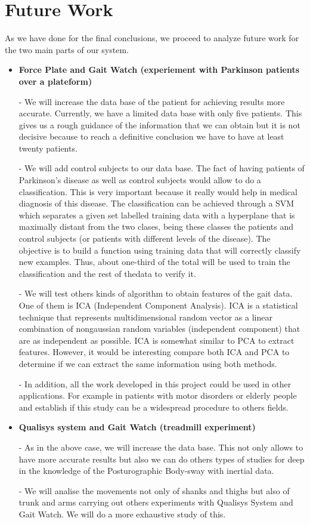\section{Future Work}
As we have done for the final conclusions, we proceed to analyze future work for the two main parts of our system.

\begin{itemize}
\item \textbf{Force Plate and Gait Watch (experiement with Parkinson patients over a plateform)}

- We will increase the data base of the patient for achieving results more accurate. Currently, we have a limited data base with only five patients. This gives us a rough guidance of the information that we can obtain but it is not decisive because to reach a definitive conclusion we have to have at least twenty patients.

-	We will add control subjects to our data base. The fact of having patients of Parkinson’s disease as well as control subjects would allow to do a classification. This is very important because it really would help in medical diagnosis of this disease.
The classification can be achieved through a SVM which separates a given set labelled training data with a hyperplane that is maximally distant from the two clases, being these classes the patients and control subjects (or patients with different levels of the disease). The objective is to build a function using training data that will correctly classify new examples. Thus, about one-third of the total will be used to train the classification and the rest of thedata to verify it.

- We will test others kinds of algorithm to obtain features of the gait data. One of them is ICA (Independent Component Analysis).  ICA is a statistical technique that represents multidimensional random vector  as a linear combination of nongaussian random variables (independent component) that are as independent as possible. ICA is somewhat similar to PCA to extract features. However, it would be interesting compare both ICA and PCA to determine if we can extract the same information using both methods. 

- In addition, all the work developed in this project could be used in other applications. For example in patients with motor disorders or elderly people and establish if this study can be a widespread procedure to others fields.

\item \textbf{Qualisys system and Gait Watch (treadmill experiment)}

-	As in the above case, we will increase the data base. This not only allows to have more accurate results but also we can do others types of studies for deep in the knowledge of the Posturographic Body-sway  with inertial data.

-	We will analise the movements not only of shanks and thighs but also of trunk and arms carrying out others experiments with Qualisys System and Gait Watch. We will do a more exhaustive study of this.
	
\end{itemize}